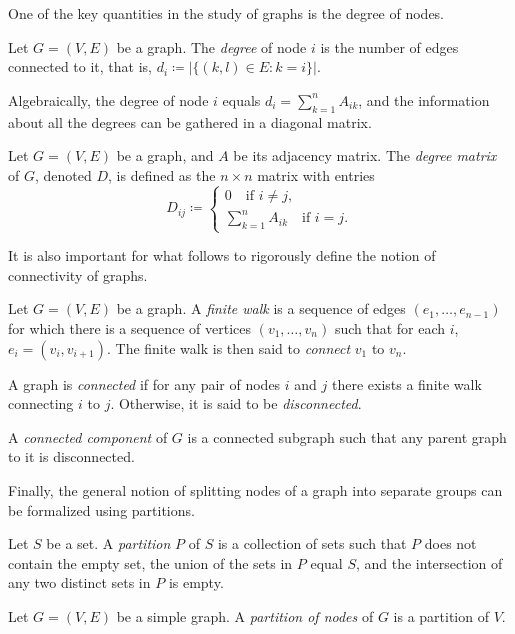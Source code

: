 \documentclass[../../main.tex]{subfiles} %
\begin{document}
One of the key quantities in the study of graphs is the degree of nodes.
\begin{definition}
	Let \(G=(V, E)\) be a graph. The \textit{degree} of node \(i\) is the 
	number 
	of edges connected to it, that is, \(d_i \coloneqq \vert \{(k, l) \in E : k = 
	i\} 
	\vert\).
\end{definition}
Algebraically, the degree of node \(i\) equals \(d_i = \sum_{k=1}^n A_{ik}\), 
and the information about all the degrees can be gathered in a diagonal 
matrix.
\begin{definition}
	Let \(G=(V, E)\) be a graph, and \(A\) be its adjacency matrix. The 
	\textit{degree matrix} of \(G\), denoted \(D\), is defined as the \(n \times n\) 
	matrix with entries
	\begin{equation}
		D_{ij} \coloneqq \begin{cases}
			0 \quad \text{if } i \neq j,\\
			\sum_{k=1}^n A_{ik} \quad \text{if } i = j.
		\end{cases}
	\end{equation}
\end{definition}

It is also important for what follows to rigorously define the notion of 
connectivity of graphs.
\begin{definition}
	Let \(G = (V, E)\) be a graph.
	A \textit{finite walk} is a sequence of edges 
	\((e_1, \dots, e_{n-1})\) for which there is a sequence of vertices 
	\((v_1, 
	\dots, v_n)\) such that for each \(i\), \(e_i = (v_i, v_{i+1})\). The finite 
	walk is 
	then said to \textit{connect} \(v_1\) to \(v_n\). 
\end{definition}
\begin{definition}
	A graph is \textit{connected} if for any pair of nodes \(i\) and \(j\) there 
	exists a finite walk connecting \(i\) to \(j\). Otherwise, it is said to be 
	\textit{disconnected}.
\end{definition}
\begin{definition}
	A \textit{connected component} of \(G\) is a connected subgraph such 
	that 
	any parent graph to it is disconnected.
\end{definition}

Finally, the general notion of splitting nodes of a graph into separate groups 
can be formalized using partitions.
\begin{definition}
	Let \(S\) be a set. A \textit{partition} \(P\) of \(S\) is a collection of sets 
	such 
	that \(P\) does not contain the empty set, the union of the sets in \(P\) 
	equal 
	\(S\), and the intersection of any two distinct sets in \(P\) is empty.
\end{definition}
\begin{definition}
	Let \(G = (V, E)\) be a simple graph. A \textit{partition of nodes} of \(G\) 
	is 
	a partition of \(V\).
\end{definition}
\end{document}
